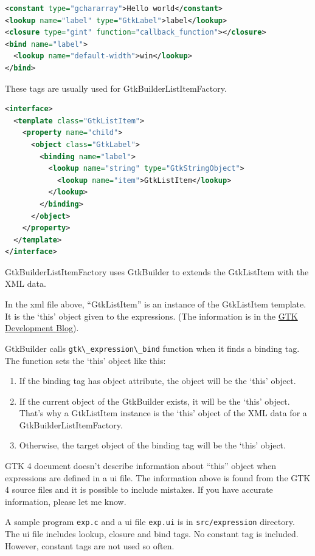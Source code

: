\begin{lstlisting}[language=XML]
<constant type="gchararray">Hello world</constant>
<lookup name="label" type="GtkLabel">label</lookup>
<closure type="gint" function="callback_function"></closure>
<bind name="label">
  <lookup name="default-width">win</lookup>
</bind>
\end{lstlisting}

These tags are usually used for GtkBuilderListItemFactory.

\begin{lstlisting}[language=XML]
<interface>
  <template class="GtkListItem">
    <property name="child">
      <object class="GtkLabel">
        <binding name="label">
          <lookup name="string" type="GtkStringObject">
            <lookup name="item">GtkListItem</lookup>
          </lookup>
        </binding>
      </object>
    </property>
  </template>
</interface>
\end{lstlisting}

GtkBuilderListItemFactory uses GtkBuilder to extends the GtkListItem
with the XML data.

In the xml file above, ``GtkListItem'' is an instance of the GtkListItem
template. It is the `this' object given to the expressions. (The
information is in the \href{https://blog.gtk.org/2020/09/}{GTK
Development Blog}).

GtkBuilder calls \passthrough{\lstinline!gtk\_expression\_bind!}
function when it finds a binding tag. The function sets the `this'
object like this:

\begin{enumerate}
\def\labelenumi{\arabic{enumi}.}
\tightlist
\item
  If the binding tag has object attribute, the object will be the `this'
  object.
\item
  If the current object of the GtkBuilder exists, it will be the `this'
  object. That's why a GtkListItem instance is the `this' object of the
  XML data for a GtkBuilderListItemFactory.
\item
  Otherwise, the target object of the binding tag will be the `this'
  object.
\end{enumerate}

GTK 4 document doesn't describe information about ``this'' object when
expressions are defined in a ui file. The information above is found
from the GTK 4 source files and it is possible to include mistakes. If
you have accurate information, please let me know.

A sample program \passthrough{\lstinline!exp.c!} and a ui file
\passthrough{\lstinline!exp.ui!} is in
\passthrough{\lstinline!src/expression!} directory. The ui file includes
lookup, closure and bind tags. No constant tag is included. However,
constant tags are not used so often.

